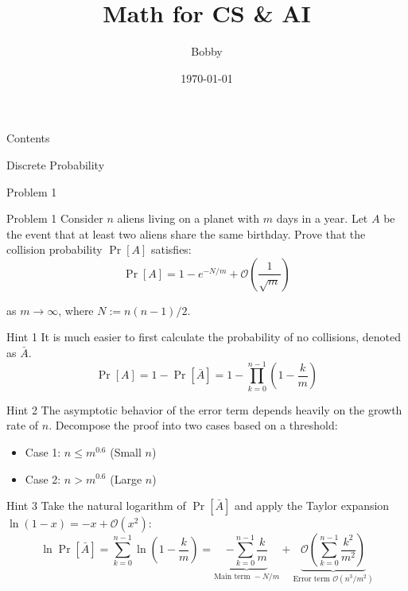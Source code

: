 \documentclass{beamer}
\title{Math for CS \& AI}
\author{Bobby}
\institute{IIIS, Tsinghua University}
\date{\today}
\begin{document}
\begin{frame}
    \titlepage
\end{frame}

\begin{frame}{Contents}
    \tableofcontents[hideallsubsections]
\end{frame}

\begin{section}{Discrete Probability}

\begin{subsection}{Problem 1}
    \begin{frame}
        \begin{block}{Problem 1}
            Consider \(n\) aliens living on a planet with \(m\) days in a year. Let \(A\) be the event that at least two aliens share the same birthday. Prove that the collision probability $\Pr[A]$ satisfies:
            \[\Pr[A] = 1 - e^{-N/m} + \mathcal{O}\left(\frac{1}{\sqrt{m}}\right)\]

            as \(m \to \infty\), where \(N := n(n-1)/2\).    
        \end{block}
    \end{frame}

    \begin{frame}
        \begin{block}{Hint 1}
            It is much easier to first calculate the probability of no collisions, denoted as $\bar{A}$.
            \[
                \Pr[A] = 1 - \Pr[\bar{A}] = 1 - \prod_{k=0}^{n-1} \left(1 - \frac{k}{m}\right)
            \]
        \end{block}

        \pause
        \vspace{2em}
        \begin{block}{Hint 2}
            The asymptotic behavior of the error term depends heavily on the growth rate of $n$. Decompose the proof into two cases based on a threshold:
            \begin{itemize}
                \item Case 1: $n \le m^{0.6}$ (Small $n$)
                \item Case 2: $n > m^{0.6}$ (Large $n$)
            \end{itemize}
        \end{block}

    \end{frame}

    \begin{frame}
        \begin{block}{Hint 3}
            Take the natural logarithm of $\Pr[\bar{A}]$ and apply the Taylor expansion $\ln(1-x) = -x + \mathcal{O}(x^2)$:
            \[
                \ln \Pr[\bar{A}] = \sum_{k=0}^{n-1} \ln\left(1 - \frac{k}{m}\right) = \underbrace{-\sum_{k=0}^{n-1} \frac{k}{m}}_{\text{Main term } -N/m} + \underbrace{\mathcal{O}\left(\sum_{k=0}^{n-1} \frac{k^2}{m^2}\right)}_{\text{Error term } \mathcal{O}(n^3/m^2)}
            \]
        \end{block}
    \end{frame} 


\end{subsection}
\end{section}
\end{document}

